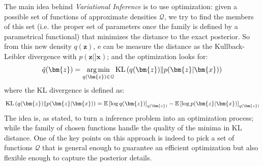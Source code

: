 
The main idea behind \textit{Variational Inference} is to use optimization: given a possible set of functions of approximate densities $\mathcal{Q}$, we try to find the members of this set (i.e. the proper set of parameters once the family is defined by a parametrical functional) that minimizes the distance to the exact posterior. So from this new density $q(\bm{z})$, e can be measure the distance as the Kullback-Leibler divergence with $p(\bm{z}|]\bm{x})$; and the optimization looks for:
\begin{equation}
    \tilde{q}(\bm{z}) = \argmin{q(\bm{z}) \in \mathcal{Q}} \KLD{q(\bm{z})}{p(\bm{z}|\bm{x})}
    \label{eq:variational_inference}
\end{equation}
where the KL divergence is defined as:
\begin{equation}
    \KLD{q(\bm{z})}{p(\bm{z}|\bm{x})} = \expectation{\log q(\bm{z})}_{q(\bm{z})} - \expectation{\log p(\bm{z}|\bm{x})}_{q(\bm{z})}
    \label{eq:kulback-leibler}
\end{equation}
The idea is, as stated, to turn a inference problem into an optimization process; while the family of chosen functions handle the quality of the minima in KL distance. One of the key points on this approach is indeed to pick a set of functions $\mathcal{Q}$ that is general enough to guarantee an efficient optimization but also flexible enough to capture the posterior details.

